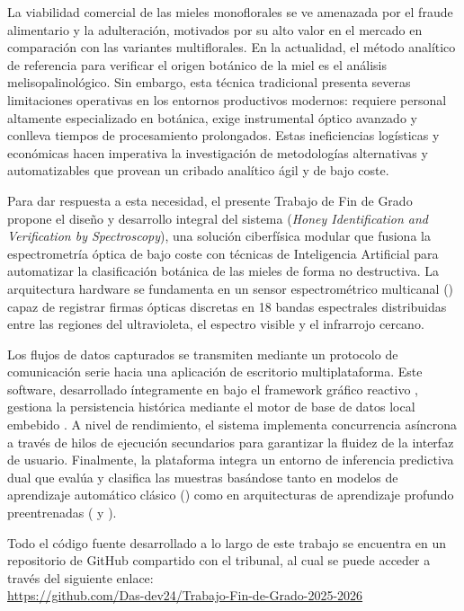 
La viabilidad comercial de las mieles monoflorales se ve amenazada por el fraude alimentario y la adulteración, motivados por su alto valor en el mercado en comparación con las variantes multiflorales. En la actualidad, el método analítico de referencia para verificar el origen botánico de la miel es el análisis melisopalinológico. Sin embargo, esta técnica tradicional presenta severas limitaciones operativas en los entornos productivos modernos: requiere personal altamente especializado en botánica, exige instrumental óptico avanzado y conlleva tiempos de procesamiento prolongados. Estas ineficiencias logísticas y económicas hacen imperativa la investigación de metodologías alternativas y automatizables que provean un cribado analítico ágil y de bajo coste.

Para dar respuesta a esta necesidad, el presente Trabajo de Fin de Grado propone el diseño y desarrollo integral del sistema  (\textit{Honey Identification and Verification by Spectroscopy}), una solución ciberfísica modular que fusiona la espectrometría óptica de bajo coste con técnicas de Inteligencia Artificial para automatizar la clasificación botánica de las mieles de forma no destructiva. La arquitectura hardware se fundamenta en un sensor espectrométrico multicanal () capaz de registrar firmas ópticas discretas en 18 bandas espectrales distribuidas entre las regiones del ultravioleta, el espectro visible y el infrarrojo cercano.

Los flujos de datos capturados se transmiten mediante un protocolo de comunicación serie  hacia una aplicación de escritorio multiplataforma. Este software, desarrollado íntegramente en  bajo el framework gráfico reactivo , gestiona la persistencia histórica mediante el motor de base de datos local embebido . A nivel de rendimiento, el sistema implementa concurrencia asíncrona a través de hilos de ejecución secundarios para garantizar la fluidez de la interfaz de usuario. Finalmente, la plataforma integra un entorno de inferencia predictiva dual que evalúa y clasifica las muestras basándose tanto en modelos de aprendizaje automático clásico () como en arquitecturas de aprendizaje profundo preentrenadas ( y ).

Todo el código fuente desarrollado a lo largo de este trabajo se encuentra en un repositorio de GitHub compartido con el tribunal, al cual se puede acceder a través del siguiente enlace:\\
 \url{https://github.com/Das-dev24/Trabajo-Fin-de-Grado-2025-2026}
\\


